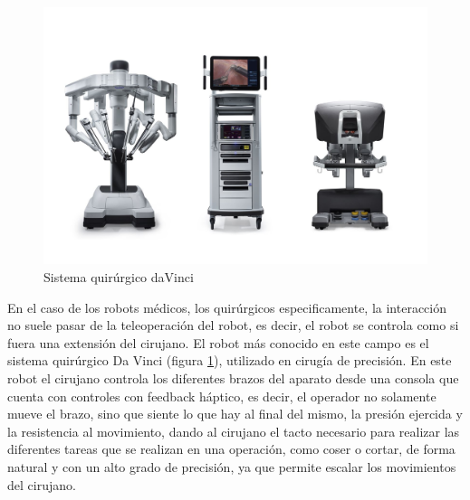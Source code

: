 \begin{figure}
	\centering
	\includegraphics[width=1\linewidth]{imagenes/davincisystem.jpg}
	\caption{Sistema quirúrgico daVinci}
	\label{fig:davincisystem}
\end{figure} 
 
 En el caso de los robots médicos, los quirúrgicos especificamente, la interacción no suele pasar de la teleoperación del robot, es decir, el robot se controla como si fuera una extensión del cirujano. El robot más conocido en este campo es el sistema quirúrgico Da Vinci (figura \ref{fig:davincisystem}), utilizado en cirugía de precisión. En este robot el cirujano controla los diferentes brazos del aparato desde una consola que cuenta con controles con feedback háptico, es decir, el operador no solamente mueve el brazo, sino que siente lo que hay al final del mismo, la presión ejercida y la resistencia al movimiento, dando al cirujano el tacto necesario para realizar las diferentes tareas que se realizan en una operación, como coser o cortar, de forma natural y con un alto grado de precisión, ya que permite escalar los movimientos del cirujano.
 

 
